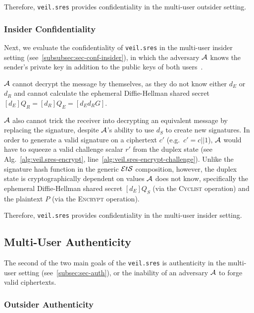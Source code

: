Therefore, \texttt{veil.sres} provides confidentiality in the multi-user outsider setting.

\subsubsection{Insider Confidentiality}

Next, we evaluate the confidentiality of \texttt{veil.sres} in the multi-user insider setting
(see~\ref{subsubsec:sec-conf-insider}), in which the adversary $\mathcal{A}$ knows the sender's private key in addition
to the public keys of both users~\cite[p. 45--46]{baek2010}.

$\mathcal{A}$ cannot decrypt the message by themselves, as they do not know either $d_E$ or $d_R$ and cannot calculate
the ephemeral Diffie-Hellman shared secret $[d_E]Q_R=[d_R]Q_E=[d_E{d_R}G]$.

$\mathcal{A}$ also cannot trick the receiver into decrypting an equivalent message by replacing the signature, despite
$\mathcal{A}$'s ability to use $d_S$ to create new signatures.
In order to generate a valid signature on a ciphertext $c'$ (e.g.\ $c'=c||1$), $\mathcal{A}$ would have to squeeze a
valid challenge scalar $r'$ from the duplex state (see Alg.~\ref{alg:veil.sres-encrypt},
line~\ref{alg:veil.sres-encrypt-challenge}).
Unlike the signature hash function in the generic $\mathcal{E}t\mathcal{S}$ composition, however, the duplex state is cryptographically
dependent on values $\mathcal{A}$ does not know, specifically the ephemeral Diffie-Hellman shared secret $[d_E]Q_S$
(via the \textsc{Cyclist} operation) and the plaintext $P$ (via the \textsc{Encrypt} operation).

Therefore, \texttt{veil.sres} provides confidentiality in the multi-user insider setting.

\subsection{Multi-User Authenticity}\label{subsec:veil.sres-auth}

The second of the two main goals of the \texttt{veil.sres} is authenticity in the multi-user setting
(see~\ref{subsec:sec-auth}), or the inability of an adversary $\mathcal{A}$ to forge valid ciphertexts.

\subsubsection{Outsider Authenticity}

